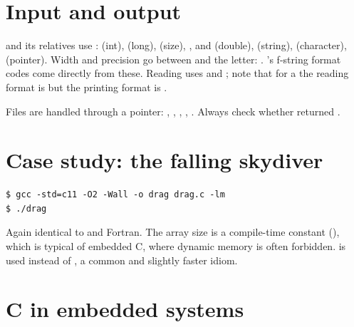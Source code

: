 \section{Input and output}

 and its relatives use :  (int),
 (long),  (size), ,  and  (double),
 (string),  (character),  (pointer). Width and precision go
between \code{\%} and the letter: . \py's f-string format codes come
directly from these. Reading uses  and ; note that for a
 the reading format is  but the printing format is .

Files are handled through a  pointer: , ,
, , . Always check whether  returned
.

\section{Case study: the falling skydiver}

\begin{lstlisting}[style=shell]
$ gcc -std=c11 -O2 -Wall -o drag drag.c -lm
$ ./drag
\end{lstlisting}
Again identical to \py and Fortran. The array size is a compile-time constant
(), which is typical of embedded C, where dynamic memory is often
forbidden.  is used instead of , a common and slightly faster
idiom.

\section{C in embedded systems}

